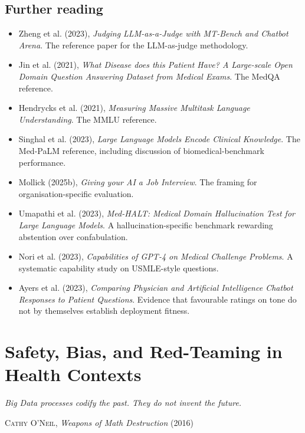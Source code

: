 \documentclass[
  letterpaper,
  11pt]{scrbook}
\providecommand{\tightlist}{%
  \setlength{\itemsep}{0pt}\setlength{\parskip}{0pt}}
\begin{document}
\section{Further reading}\label{further-reading-9}

\begin{itemize}
\tightlist
\item
  Zheng et al. (2023), \emph{Judging LLM-as-a-Judge with MT-Bench and
  Chatbot Arena}. The reference paper for the LLM-as-judge methodology.
\item
  Jin et al. (2021), \emph{What Disease does this Patient Have? A
  Large-scale Open Domain Question Answering Dataset from Medical
  Exams}. The MedQA reference.
\item
  Hendrycks et al. (2021), \emph{Measuring Massive Multitask Language
  Understanding}. The MMLU reference.
\item
  Singhal et al. (2023), \emph{Large Language Models Encode Clinical
  Knowledge}. The Med-PaLM reference, including discussion of
  biomedical-benchmark performance.
\item
  Mollick (2025b), \emph{Giving your AI a Job Interview}. The framing
  for organisation-specific evaluation.
\item
  Umapathi et al. (2023), \emph{Med-HALT: Medical Domain Hallucination
  Test for Large Language Models}. A hallucination-specific benchmark
  rewarding abstention over confabulation.
\item
  Nori et al. (2023), \emph{Capabilities of GPT-4 on Medical Challenge
  Problems}. A systematic capability study on USMLE-style questions.
\item
  {Ayers et al.} (2023), \emph{Comparing Physician and Artificial
  Intelligence Chatbot Responses to Patient Questions}. Evidence that
  favourable ratings on tone do not by themselves establish deployment
  fitness.
\end{itemize}

\chapter{Safety, Bias, and Red-Teaming in Health
Contexts}\label{sec-safety-bias}

\begin{flushright}\small

\emph{Big Data processes codify the past. They do not invent the
future.}

\textsc{Cathy O'Neil}, \emph{Weapons of Math Destruction} (2016)

\end{flushright}
\end{document}
